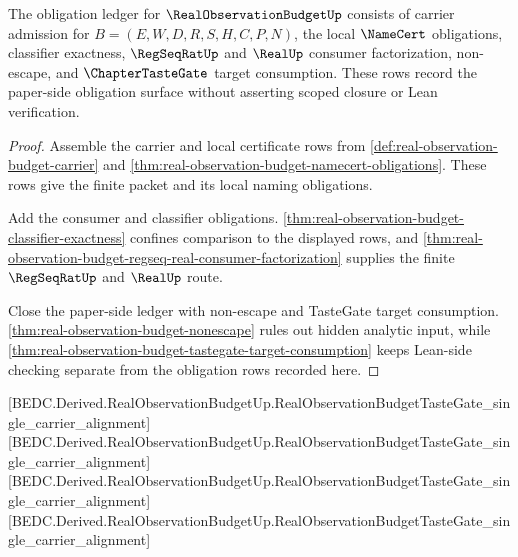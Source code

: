 \begin{theorem}
\label{thm:real-observation-budget-closure-axis-obligation-ledger}
The obligation ledger for $\RealObservationBudgetUp$ consists of carrier admission for $B=(E,W,D,R,S,H,C,P,N)$, the local $\NameCert$ obligations, classifier exactness, $\RegSeqRatUp$ and $\RealUp$ consumer factorization, non-escape, and $\ChapterTasteGate$ target consumption. These rows record the paper-side obligation surface without asserting scoped closure or Lean verification.
\end{theorem}
\begin{proof}
Assemble the carrier and local certificate rows from \autoref{def:real-observation-budget-carrier} and \autoref{thm:real-observation-budget-namecert-obligations}. These rows give the finite packet and its local naming obligations.

Add the consumer and classifier obligations. \autoref{thm:real-observation-budget-classifier-exactness} confines comparison to the displayed rows, and \autoref{thm:real-observation-budget-regseq-real-consumer-factorization} supplies the finite $\RegSeqRatUp$ and $\RealUp$ route.

Close the paper-side ledger with non-escape and TasteGate target consumption. \autoref{thm:real-observation-budget-nonescape} rules out hidden analytic input, while \autoref{thm:real-observation-budget-tastegate-target-consumption} keeps Lean-side checking separate from the obligation rows recorded here.
\end{proof}

[BEDC.Derived.RealObservationBudgetUp.RealObservationBudgetTasteGate\_single\_carrier\_alignment]
[BEDC.Derived.RealObservationBudgetUp.RealObservationBudgetTasteGate\_single\_carrier\_alignment]
[BEDC.Derived.RealObservationBudgetUp.RealObservationBudgetTasteGate\_single\_carrier\_alignment]
[BEDC.Derived.RealObservationBudgetUp.RealObservationBudgetTasteGate\_single\_carrier\_alignment]

